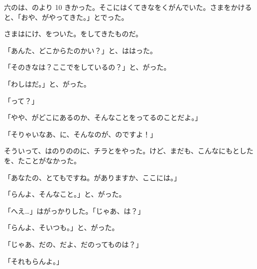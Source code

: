 六のは、のより 10 きかった。そこにはくてきなをくがんでいた。さまをかけると、「おや、がやってきた。」とでった。

さまはにけ、をついた。をしてきたものだ。

「あんた、どこからたのかい？」と、ははった。

「そのきなは？ここでをしているの？」と、がった。

「わしはだ。」と、がった。

「って？」

「やや、がどこにあるのか、そんなことをってるのことだよ。」

「そりゃいなあ、に、そんなのが、のですよ！」

そういって、はのりののに、チラとをやった。けど、まだも、こんなにもとしたを、たことがなかった。

「あなたの、とてもですね。がありますか、ここには。」

「らんよ、そんなこと。」と、がった。

「へえ…」はがっかりした。「じゃあ、は？」

「らんよ、そいつも。」と、がった。

「じゃあ、だの、だよ、だのってものは？」

「それもらんよ。」

